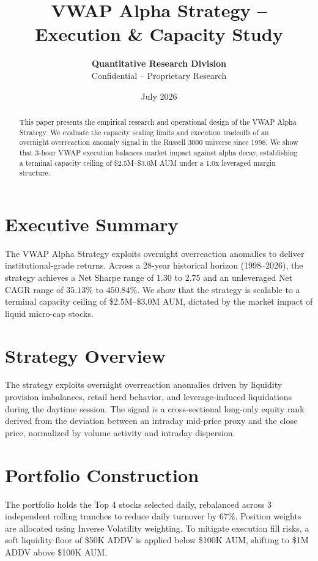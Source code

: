 \documentclass[11pt,a4paper]{article}
\title{\textbf{VWAP Alpha Strategy -- Execution \& Capacity Study}}
\author{\textbf{Quantitative Research Division} \\ Confidential -- Proprietary Research}
\date{July 2026}
\begin{document}
\maketitle

\begin{abstract}
This paper presents the empirical research and operational design of the VWAP Alpha Strategy. We evaluate the capacity scaling limits and execution tradeoffs of an overnight overreaction anomaly signal in the Russell 3000 universe since 1998. We show that 3-hour VWAP execution balances market impact against alpha decay, establishing a terminal capacity ceiling of \$2.5M--\$3.0M AUM under a 1.0x leveraged margin structure.
\end{abstract}

\section{Executive Summary}
The VWAP Alpha Strategy exploits overnight overreaction anomalies to deliver institutional-grade returns. Across a 28-year historical horizon (1998--2026), the strategy achieves a Net Sharpe range of $1.30$ to $2.75$ and an unleveraged Net CAGR range of $35.13\%$ to $450.84\%$. We show that the strategy is scalable to a terminal capacity ceiling of \$2.5M--\$3.0M AUM, dictated by the market impact of liquid micro-cap stocks.

\section{Strategy Overview}
The strategy exploits overnight overreaction anomalies driven by liquidity provision imbalances, retail herd behavior, and leverage-induced liquidations during the daytime session. The signal is a cross-sectional long-only equity rank derived from the deviation between an intraday mid-price proxy and the close price, normalized by volume activity and intraday dispersion.

\section{Portfolio Construction}
The portfolio holds the Top 4 stocks selected daily, rebalanced across 3 independent rolling tranches to reduce daily turnover by $67\%$. Position weights are allocated using Inverse Volatility weighting. To mitigate execution fill risks, a soft liquidity floor of \$50K ADDV is applied below \$100K AUM, shifting to \$1M ADDV above \$100K AUM.
\end{document}
